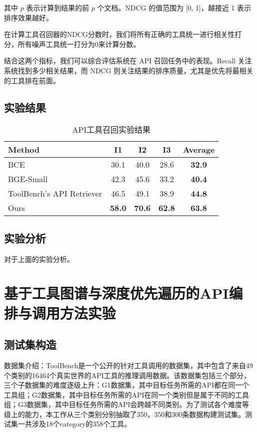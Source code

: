 其中 \(p\) 表示计算到结果的前 \(p\) 个文档。NDCG 的值范围为 [0, 1]，越接近 1 表示排序效果越好。

在计算工具召回器的NDCG分数时，我们将所有正确的工具统一进行相关性打分，所有噪声工具统一打分为0来计算分数。

结合这两个指标，我们可以综合评估系统在 API 召回任务中的表现。Recall 关注系统找到多少相关结果，而 NDCG 则关注结果的排序质量，尤其是优先将最相关的工具排在前面。

\subsection{实验结果}

\begin{table}[!ht]
  \centering
  \caption{API工具召回实验结果}
  \label{tab:comparison}
  \begin{tabular}{lccc>{\bfseries}c} %
    \toprule
    \textbf{Method} & \textbf{I1} & \textbf{I2} & \textbf{I3} & \textbf{Average} \\ \midrule
    BCE         & 30.1 & 40.0 & 28.6 & 32.9 \\
    BGE-Small         & 42.3 & 45.6 & 33.2 & 40.4 \\
    ToolBench's API Retriever   & 46.5 & 49.1 & 38.9 & 44.8 \\
    Ours        & \textbf{58.0} & \textbf{70.6} & \textbf{62.8} & \textbf{63.8} \\ \bottomrule
  \end{tabular}
\end{table}

\subsection{实验分析}

对于上面的实验分析。

\section{基于工具图谱与深度优先遍历的API编排与调用方法实验}

\subsection{测试集构造}

数据集介绍：ToolBench\cite{Qin2023}是一个公开的针对工具调用的数据集，其中包含了来自49个类别的16464个真实世界的API工具的推理调用数据。该数据集包括三个部分，三个子数据集的难度逐级上升：G1数据集，其中目标任务所需的API都在同一个工具组；G2数据集，其中目标任务所需的API在同一个类别但是属于不同的工具组；G3数据集，其中目标任务所需的API会跨越不同类别。为了测试各个难度等级上的能力，本工作从三个类别分别抽取了350，350和300条数据构建测试集。测试集一共涉及18个category的358个工具。

